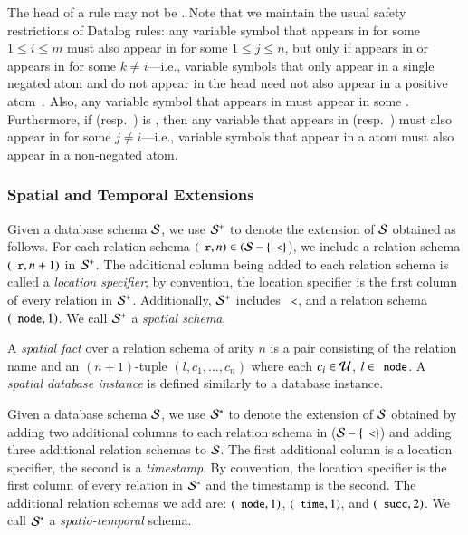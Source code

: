 The head of a rule  may not be \dedalus{<}.  Note that we maintain the usual safety
restrictions of Datalog rules:  any variable symbol  that appears in
 for some $1 \leq i \leq m$ must also appear in
 for some $1 \leq j \leq n$, but only if 
appears in  or  appears in
 for some $k \neq i$---i.e., variable symbols that
only appear in a single negated atom and do not appear in the head need not also
appear in a positive atom~\cite{ullmanbook}.  Also, any variable symbol  that appears in  must appear in some .
Furthermore, if  (resp.\ ) is \dedalus{<}, then any variable that appears in  (resp.\ ) must also appear in  for some $j \neq i$---i.e., variable symbols that appear in a \dedalus{<} atom must also appear in a non-negated atom.

\subsubsection{Spatial and Temporal Extensions}

Given a database schema $\schema$, we use $\sschema$ to denote the extension of $\schema$
obtained as follows. For each relation schema $(\dedalus{r}, n) \in (\schema-\{\dedalus{<}\}$), we include a relation schema $(\dedalus{r}, n+1)$ in $\sschema$. The
additional column being added to each relation schema is called a {\em location specifier}; by convention, the
location specifier is the first column of every relation in $\sschema$.
Additionally, $\sschema$ includes $\dedalus{<}$, and a relation schema $(\dedalus{node},1)$.
We call $\sschema$ a {\em spatial schema}.

A {\em spatial fact} over a relation schema of arity $n$ is a pair consisting of the relation name and an $(n+1)$-tuple $(l,c_1,\ldots,c_n)$ where each $c_i \in \univ$, $l \in \dedalus{node}$.  A {\em spatial database instance} is defined similarly to a database instance.

Given a database schema $\schema$, we use $\stschema$ to denote the extension of
$\schema$ obtained by adding two additional columns to each relation schema in ($\schema - \{\dedalus{<}\}$) and adding three additional relation schemas to $\schema$. 
The first additional column is a location specifier, the second is a {\em timestamp}.  By convention, the location specifier is the first column of every relation in $\stschema$ and the timestamp is the second.  
The additional relation schemas we add are: $(\dedalus{node},1)$,
$(\dedalus{time},1)$, and $(\dedalus{succ},2)$.
We call $\stschema$ a {\em spatio-temporal} schema.

